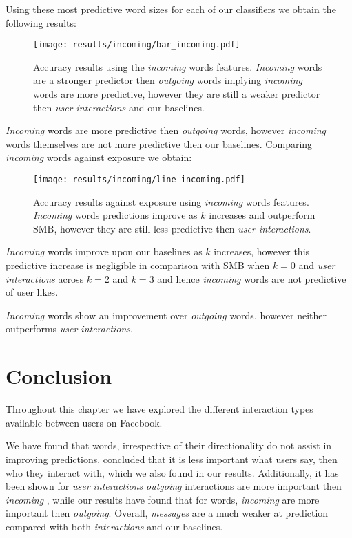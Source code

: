 Using these most predictive word sizes for each of our classifiers we obtain the following results:

\begin{figure}[h]
	\begin{center}
		\texttt{[image: results/incoming/bar\_incoming.pdf]}
		\caption{Accuracy results using the \emph{incoming} words features. \emph{Incoming} words are a 
				 stronger predictor then \emph{outgoing} words implying \emph{incoming} words are more predictive, however they are still a weaker predictor then \emph{user interactions} and our baselines.}
	\end{center}
\end{figure}

\emph{Incoming} words are more predictive then \emph{outgoing} words, however \emph{incoming} words themselves are not more predictive then our baselines.
Comparing \emph{incoming} words against exposure we obtain:

\begin{figure}[h]
	\begin{center}
		\texttt{[image: results/incoming/line\_incoming.pdf]}
		\caption{Accuracy results against exposure using \emph{incoming} words features. 
				 \emph{Incoming} words predictions improve as $k$ increases and outperform SMB, however they are still less predictive then \emph{user interactions}.
		}
	\end{center}
\end{figure}

\clearpage

\emph{Incoming} words improve upon our baselines as $k$ increases, however this predictive increase is 
negligible in comparison with SMB when $k = 0$ and \emph{user interactions} across $k=2$ and $k=3$ and 
hence \emph{incoming} words are not predictive of user likes.

\emph{Incoming} words show an improvement over \emph{outgoing} words, however neither outperforms \emph{user interactions}.

\section{Conclusion}
\label{sec:conc}

Throughout this chapter we have explored the different interaction types available between users on Facebook. 

We have found that words, irrespective of their directionality do not assist in improving predictions. \cite{Anderson2012} concluded 
that it is less important what users say, then who they interact with, which we also found in our results. Additionally, it has been shown
for \emph{user interactions} \emph{outgoing} interactions are more important then \emph{incoming} \cite{www}, while our results have found that
for words, \emph{incoming} are more important then \emph{outgoing}. Overall, \emph{messages} are a much weaker at prediction compared 
with both \emph{interactions} and our baselines.

